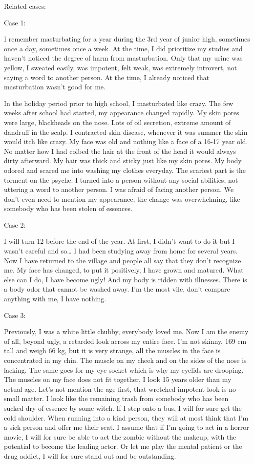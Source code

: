 \documentclass[
]{book}
\begin{document}
Related cases:

Case 1:

I remember masturbating for a year during the 3rd year of junior high, sometimes once a day, sometimes once a week. At the time, I did prioritize my studies and haven't noticed the degree of harm from masturbation. Only that my urine was yellow, I sweated easily, was impotent, felt weak, was extremely introvert, not saying a word to another person. At the time, I already noticed that masturbation wasn't good for me.

In the holiday period prior to high school, I masturbated like crazy. The few weeks after school had started, my appearance changed rapidly. My skin pores were large, blackheads on the nose. Lots of oil secretion, extreme amount of dandruff in the scalp. I contracted skin disease, whenever it was summer the skin would itch like crazy. My face was old and nothing like a face of a 16-17 year old. No matter how I had colbed the hair at the front of the head it would always dirty afterward. My hair was thick and sticky just like my skin pores. My body odored and scared me into washing my clothes everyday. The scariest part is the torment on the psyche. I turned into a person without any social abilities, not uttering a word to another person. I was afraid of facing another person. We don't even need to mention my appearance, the change was overwhelming, like somebody who has been stolen of essences.

Case 2:

I will turn 12 before the end of the year. At first, I didn't want to do it but I wasn't careful and so\ldots{} I had been studying away from home for several years. Now I have returned to the village and people all say that they don't recognize me. My face has changed, to put it positively, I have grown and matured. What else can I do, I have become ugly! And my body is ridden with illnesses. There is a body odor that cannot be washed away. I'm the most vile, don't compare anything with me, I have nothing.

Case 3:

Previously, I was a white little chubby, everybody loved me. Now I am the enemy of all, beyond ugly, a retarded look across my entire face. I'm not skinny, 169 cm tall and weigh 66 kg, but it is very strange, all the muscles in the face is concentrated in my chin. The muscle on my cheek and on the sides of the nose is lacking. The same goes for my eye socket which is why my eyelids are drooping. The muscles on my face does not fit together, I look 15 years older than my actual age. Let's not mention the age first, that wretched impotent look is no small matter. I look like the remaining trash from somebody who has been sucked dry of essence by some witch. If I step onto a bus, I will for sure get the cold shoulder. When running into a kind person, they will at most think that I'm a sick person and offer me their seat. I assume that if I'm going to act in a horror movie, I will for sure be able to act the zombie without the makeup, with the potential to become the leading actor. Or let me play the mental patient or the drug addict, I will for sure stand out and be outstanding.
\end{document}

